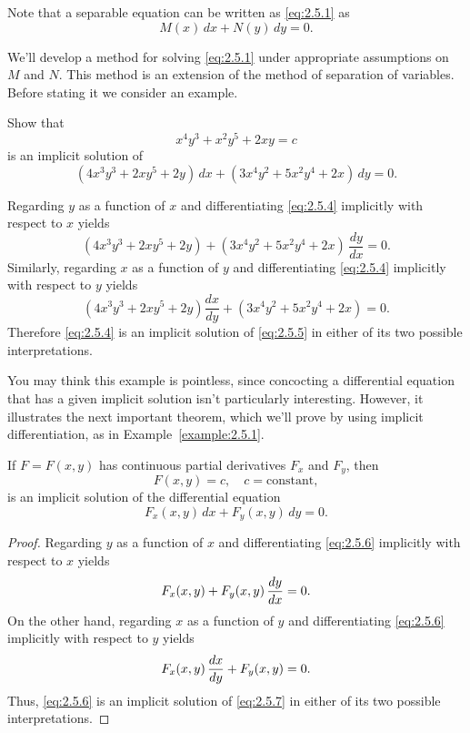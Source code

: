 \documentclass{ximera}
\begin{document}
Note that a separable equation can be written as
\eqref{eq:2.5.1} as
$$
M(x)\,dx+N(y)\,dy=0.
$$


We'll  develop a method for solving \eqref{eq:2.5.1} under appropriate
assumptions on $M$ and $N$. This method is an extension
of the method of separation of variables.
Before stating it we
consider an  example.

\begin{example}\label{example:2.5.1}
Show that
\begin{equation} \label{eq:2.5.4}
x^4y^3+x^2y^5+2xy=c
\end{equation}
is an implicit solution of
\begin{equation} \label{eq:2.5.5}
(4x^3y^3+2xy^5+2y)\,dx+(3x^4y^2+5x^2y^4+2x)\,dy=0.
\end{equation}

\begin{explanation}
Regarding $y$ as a function of $x$ and
differentiating \eqref{eq:2.5.4} implicitly with respect to
$x$ yields
$$
(4x^3y^3+2xy^5+2y)+(3x^4y^2+5x^2y^4+2x)\,\frac{dy}{dx}=0.
$$
Similarly, regarding $x$ as a function of $y$ and
differentiating \eqref{eq:2.5.4} implicitly with respect to
$y$ yields
$$
(4x^3y^3+2xy^5+2y)\frac{dx}{dy}+(3x^4y^2+5x^2y^4+2x)=0.
$$
Therefore \eqref{eq:2.5.4} is an implicit solution of \eqref{eq:2.5.5}
in either of its two possible interpretations.
\end{explanation}
\end{example}

You may think this example is pointless, since
concocting a differential equation that has a given implicit solution
isn't particularly interesting. However, it illustrates the
next important theorem, which  we'll prove by using implicit
differentiation,  as  in  Example~\ref{example:2.5.1}.

\begin{theorem}\label{thmtype:2.5.1}
If $F=F(x,y)$ has continuous partial derivatives
$F_x$ and $F_y$, then
\begin{equation} \label{eq:2.5.6}
F(x,y)=c,\quad c=\text{constant},
\end{equation}
is an implicit solution of the differential equation
\begin{equation} \label{eq:2.5.7}
F_x(x,y)\,dx+F_y(x,y)\,dy=0.
\end{equation}
\end{theorem}

\begin{proof} Regarding $y$ as a function of $x$ and  differentiating
\eqref{eq:2.5.6}  implicitly with respect to $x$ yields
$$
F_x(x,y)+F_y(x,y)\,{dy\over dx}=0.
$$
On the other hand,
 regarding $x$ as a function of $y$ and  differentiating
\eqref{eq:2.5.6}  implicitly with respect to $y$ yields
$$
F_x(x,y)\,{dx\over dy}+F_y(x,y)=0.
$$
Thus, \eqref{eq:2.5.6} is an
implicit solution of  \eqref{eq:2.5.7} in either of its two possible
interpretations.
\end{proof}
\end{document}
